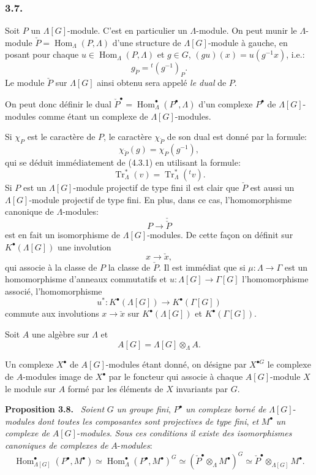 \documentclass[11pt]{article}
\newenvironment{statement}[1]{\par\medskip\noindent\textbf{#1.}\ }{\par\medskip}
\DeclareMathOperator{\Hom}{Hom}
\providecommand{\Tr}{\operatorname{Tr}}
\providecommand{\Tr}{\operatorname{Tr}}
\providecommand{\Tr}{\operatorname{Tr}}
\providecommand{\Hom}{\operatorname{Hom}}
\providecommand{\Tr}{\operatorname{Tr}}
\providecommand{\Hom}{\operatorname{Hom}}
\providecommand{\Tr}{\operatorname{Tr}}
\begin{document}
\subsubsection*{3.7.}

Soit $P$ un $\Lambda[G]$-module. C'est en particulier un $\Lambda$-module. On peut munir le $\Lambda$-module $\check P=\Hom_\Lambda(P,\Lambda)$ d'une structure de $\Lambda[G]$-module à gauche, en posant pour chaque $u\in\Hom_\Lambda(P,\Lambda)$ et $g\in G$, $(gu)(x)=u(g^{-1}x)$, i.e.:
\[
g_{\check P}={}^{t}(g^{-1})_P.
\tag{3.7.1}
\]
Le module $\check P$ sur $\Lambda[G]$ ainsi obtenu sera appelé \emph{le dual} de $P$.

On peut donc définir le dual $\check P^\bullet=\Hom_\Lambda^\bullet(P^\bullet,\Lambda)$ d'un complexe $P^\bullet$ de $\Lambda[G]$-modules comme étant un complexe de $\Lambda[G]$-modules.

Si $\chi_P$ est le caractère de $P$, le caractère $\chi_{\check P}$ de son dual est donné par la formule:
\[
\chi_{\check P}(g)=\chi_P(g^{-1}),
\tag{3.7.2}
\]
qui se déduit immédiatement de (4.3.1) en utilisant la formule:
\[
\Tr_\Lambda^*(v)=\Tr_\Lambda^*({}^{t}v).
\]
Si $P$ est un $\Lambda[G]$-module projectif de type fini il est clair que $\check P$ est aussi un $\Lambda[G]$-module projectif de type fini. En plus, dans ce cas, l'homomorphisme canonique de $\Lambda$-modules:
\[
P\longrightarrow\check{\check P}
\]
est en fait un isomorphisme de $\Lambda[G]$-modules. De cette façon on définit sur $K^{\bullet}(\Lambda[G])$ une involution
\[
x\longrightarrow \check x,
\]
qui associe à la classe de $P$ la classe de $\check P$. Il est immédiat que si $\mu:\Lambda\to\Gamma$ est un homomorphisme d'anneaux commutatifs et $u:\Lambda[G]\to\Gamma[G]$ l'homomorphisme associé, l'homomorphisme
\[
u^*:K^{\bullet}(\Lambda[G])\longrightarrow K^{\bullet}(\Gamma[G])
\]
commute aux involutions $x\longrightarrow \check x$ sur 
$K^{\bullet}(\Lambda[G])$ et $K^{\bullet}(\Gamma[G])$.

Soit $A$ une algèbre sur $\Lambda$ et
\[
A[G]=\Lambda[G]\otimes_\Lambda A.
\]

Un complexe $X^\bullet$ de $A[G]$-modules étant donné, on désigne par $X^{\bullet G}$ le complexe de $A$-modules image de $X^\bullet$ par le foncteur qui associe à chaque $A[G]$-module $X$ le module sur $A$ formé par les éléments de $X$ invariants par $G$.

\begin{statement}{Proposition 3.8}
\emph{Soient} $G$ \emph{un groupe fini}, $P^\bullet$ \emph{un complexe borné de} $\Lambda[G]$-\emph{modules dont toutes les composantes sont projectives de type fini}, \emph{et} $M^\bullet$ \emph{un complexe de} $A[G]$-\emph{modules}. \emph{Sous ces conditions il existe des isomorphismes canoniques de complexes de} $A$-\emph{modules}:
\[
\Hom_{\Lambda[G]}^\bullet(P^\bullet,M^\bullet)
\simeq \Hom_\Lambda^\bullet(P^\bullet,M^\bullet)^G
\simeq (\check P^\bullet\otimes_\Lambda M^\bullet)^G
\simeq \check P^\bullet\otimes_{\Lambda[G]}M^\bullet.
\tag{3.8.1}
\]
\end{statement}
\end{document}
